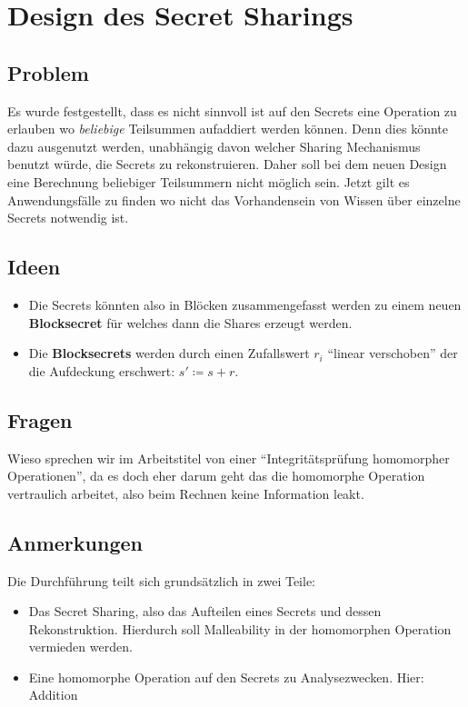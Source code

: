 \documentclass[12pt,a4paper]{scrartcl}
\begin{document}
\section*{Design des Secret Sharings}

\subsection*{Problem}

Es wurde festgestellt, dass es nicht sinnvoll ist auf den Secrets eine Operation zu erlauben wo \textit{beliebige} Teilsummen aufaddiert werden können. Denn dies könnte dazu ausgenutzt werden, unabhängig davon welcher Sharing Mechanismus benutzt würde, die Secrets zu rekonstruieren. Daher soll bei dem neuen Design eine Berechnung beliebiger Teilsummern nicht möglich sein. Jetzt gilt es Anwendungsfälle zu finden wo nicht das Vorhandensein von Wissen über einzelne Secrets notwendig ist.

\subsection*{Ideen}

\begin{itemize}
	\item 
	Die Secrets könnten also in Blöcken zusammengefasst werden zu einem neuen \textbf{Blocksecret} für welches dann die Shares erzeugt werden.
	
	\item
	Die \textbf{Blocksecrets} werden durch einen Zufallswert $r_i$ \enquote{linear verschoben} der die Aufdeckung erschwert: $s'\coloneqq s+r$.
\end{itemize}

\subsection*{Fragen}
Wieso sprechen wir im Arbeitstitel von einer \enquote{Integritätsprüfung homomorpher Operationen}, da es doch eher darum geht das die homomorphe Operation vertraulich arbeitet, also beim Rechnen keine Information leakt.

\subsection*{Anmerkungen}
Die Durchführung teilt sich grundsätzlich in zwei Teile:
\begin{itemize}
	\item 
	Das Secret Sharing, also das Aufteilen eines Secrets und dessen Rekonstruktion. Hierdurch soll Malleability in der homomorphen Operation vermieden werden.
	
	\item
	Eine homomorphe Operation auf den Secrets zu Analysezwecken. Hier: Addition
\end{itemize}
\end{document}
